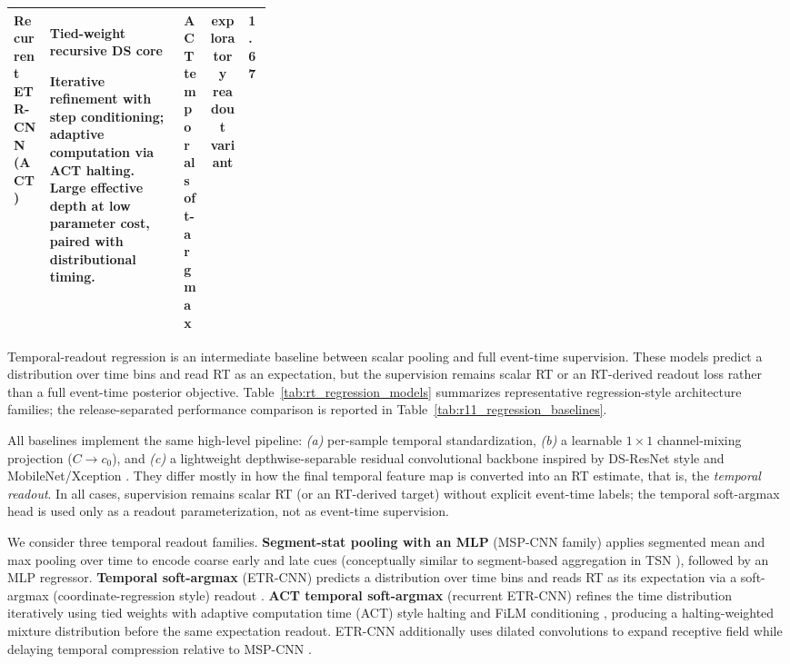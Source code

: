 \documentclass[12pt]{article}
\begin{document}
\begin{table}[!t]
\begin{tabularx}{\linewidth}{@{} 
p{0.14\linewidth} 
Y 
p{0.10\linewidth} 
c 
p{0.09\linewidth} 
@{}}
\addlinespace[0.3em]

Recurrent ETR-CNN (ACT) &
\textbf{Tied-weight recursive DS core}\par
Iterative refinement with step conditioning; adaptive computation via ACT halting.
Large effective depth at low parameter cost, paired with distributional timing. &
ACT temporal soft-argmax & exploratory readout variant & 1.67 \\

\bottomrule
\end{tabularx}

\endgroup

\end{table}


Temporal-readout regression is an intermediate baseline between scalar pooling and full event-time supervision. These models predict a distribution over time bins and read RT as an expectation, but the supervision remains scalar RT or an RT-derived readout loss rather than a full event-time posterior objective. Table~\ref{tab:rt_regression_models} summarizes representative regression-style architecture families; the release-separated performance comparison is reported in Table~\ref{tab:r11_regression_baselines}.

All baselines implement the same high-level pipeline: \emph{(a)} per-sample temporal standardization,
\emph{(b)} a learnable $1{\times}1$ channel-mixing projection ($C \!\rightarrow\! c_0$), and \emph{(c)} a lightweight
depthwise-separable residual convolutional backbone inspired by DS-ResNet style and MobileNet/Xception
\citep{howard2017mobilenets,chollet2017xception}. They differ mostly in how the final temporal feature map is converted into an RT estimate, that is, the \emph{temporal readout}.
In all cases, supervision remains scalar RT (or an RT-derived target) without explicit event-time labels; the temporal soft-argmax head is used only as a readout parameterization, not as event-time supervision.

We consider three temporal readout families. \textbf{Segment-stat pooling with an MLP} (MSP-CNN family) applies segmented mean and max
pooling over time to encode coarse early and late cues (conceptually similar to segment-based aggregation in TSN
\citep{wang2016tsn}), followed by an MLP regressor. \textbf{Temporal soft-argmax} (ETR-CNN) predicts a distribution
over time bins and reads RT as its expectation via a soft-argmax (coordinate-regression style) readout
\citep{nibali2018dsnt}. \textbf{ACT temporal soft-argmax} (recurrent ETR-CNN) refines the time distribution iteratively using tied
weights with adaptive computation time (ACT) style halting \citep{graves2016act} and FiLM conditioning \citep{perez2018film},
producing a halting-weighted mixture distribution before the same expectation readout. 
ETR-CNN additionally uses dilated convolutions to expand receptive field while delaying temporal compression relative to MSP-CNN \citep{yu2016dilated}.
\end{document}
